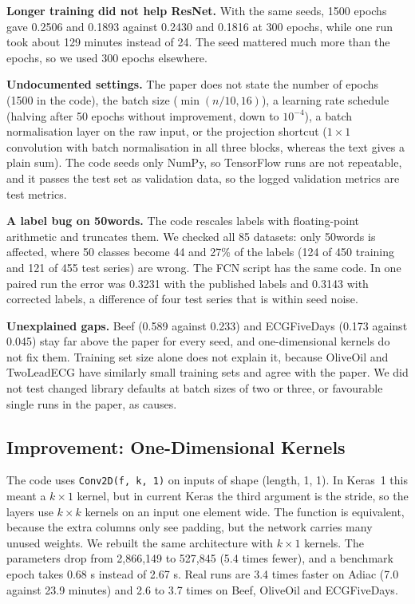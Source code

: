 \documentclass[conference]{IEEEtran}
\begin{document}
\textbf{Longer training did not help ResNet.} With the same seeds, 1500 epochs gave 0.2506 and 0.1893 against 0.2430 and 0.1816 at 300 epochs, while one run took about 129 minutes instead of 24. The seed mattered much more than the epochs, so we used 300 epochs elsewhere.

\textbf{Undocumented settings.} The paper does not state the number of epochs (1500 in the code), the batch size ($\min(n/10,16)$), a learning rate schedule (halving after 50 epochs without improvement, down to $10^{-4}$), a batch normalisation layer on the raw input, or the projection shortcut ($1\times1$ convolution with batch normalisation in all three blocks, whereas the text gives a plain sum). The code seeds only NumPy, so TensorFlow runs are not repeatable, and it passes the test set as validation data, so the logged validation metrics are test metrics.

\textbf{A label bug on 50words.} The code rescales labels with floating-point arithmetic and truncates them. We checked all 85 datasets: only 50words is affected, where 50 classes become 44 and 27\% of the labels (124 of 450 training and 121 of 455 test series) are wrong. The FCN script has the same code. In one paired run the error was 0.3231 with the published labels and 0.3143 with corrected labels, a difference of four test series that is within seed noise.

\textbf{Unexplained gaps.} Beef (0.589 against 0.233) and ECGFiveDays (0.173 against 0.045) stay far above the paper for every seed, and one-dimensional kernels do not fix them. Training set size alone does not explain it, because OliveOil and TwoLeadECG have similarly small training sets and agree with the paper. We did not test changed library defaults at batch sizes of two or three, or favourable single runs in the paper, as causes.

\subsection{Improvement: One-Dimensional Kernels}
The code uses \texttt{Conv2D(f, k, 1)} on inputs of shape (length, 1, 1). In Keras~1 this meant a $k\times1$ kernel, but in current Keras the third argument is the stride, so the layers use $k\times k$ kernels on an input one element wide. The function is equivalent, because the extra columns only see padding, but the network carries many unused weights. We rebuilt the same architecture with $k\times1$ kernels. The parameters drop from 2,866,149 to 527,845 (5.4 times fewer), and a benchmark epoch takes 0.68 s instead of 2.67 s. Real runs are 3.4 times faster on Adiac (7.0 against 23.9 minutes) and 2.6 to 3.7 times on Beef, OliveOil and ECGFiveDays.
\end{document}
